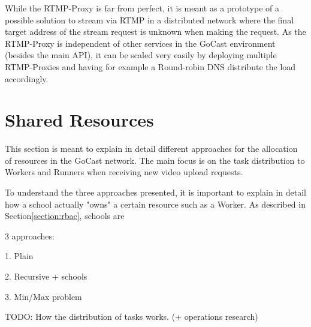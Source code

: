 While the RTMP-Proxy is far from perfect, it is meant as a prototype of a possible solution to stream via \ac{RTMP} in a distributed network where the final target address of the stream request is unknown when making the request. As the RTMP-Proxy is independent of other services in the GoCast environment (besides the main \ac{API}), it can be scaled very easily by deploying multiple RTMP-Proxies and having for example a Round-robin DNS distribute the load accordingly.

\section{Shared Resources}\label{section:shared-resources}

This section is meant to explain in detail different approaches for the allocation of resources in the GoCast network. The main focus is on the task distribution to Workers and Runners when receiving new video upload requests.

To understand the three approaches presented, it is important to explain in detail how a school actually "owns" a certain resource such as a Worker. As described in Section\ref{section:rbac}, schools are 

3 approaches:

1. Plain

2. Recursive + schools

3. Min/Max problem

TODO: How the distribution of tasks works. (+ operations research)